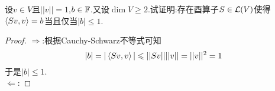 \documentclass{ctexart}
\begin{document}
\begin{problem}[14.]
    设$v\in V$且$||v||=1$,$b\in\mathbb{F}$.又设$\dim V\geqslant2$.试证明:存在酉算子$S\in\mathcal{L}(V)$使得$\left\langle{Sv},{v}\right\rangle=b$当且仅当$|b|\leqslant1$.
\end{problem}
\begin{proof}
    $\Rightarrow$:根据Cauchy-Schwarz不等式可知
    \[|b|=|\left\langle{Sv},{v}\right\rangle|\leqslant||Sv||||v||=||v||^2=1\]
    于是$|b|\leqslant1$.\\
    $\Leftarrow$:
\end{proof}
\end{document}

